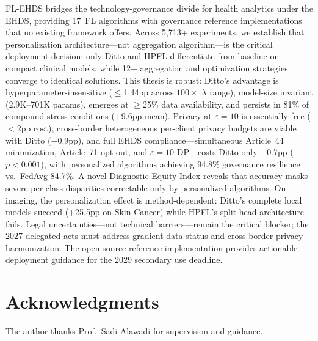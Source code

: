 \documentclass[conference]{IEEEtran}
\begin{document}
FL-EHDS bridges the technology-governance divide for health analytics under the EHDS, providing 17~FL algorithms with governance reference implementations that no existing framework offers. Across 5,713+ experiments, we establish that personalization architecture---not aggregation algorithm---is the critical deployment decision: only Ditto and HPFL differentiate from baseline on compact clinical models, while 12+ aggregation and optimization strategies converge to identical solutions. This thesis is robust: Ditto's advantage is hyperparameter-insensitive ($\leq$1.44pp across $100\times$ $\lambda$ range), model-size invariant (2.9K--701K params), emerges at $\geq$25\% data availability, and persists in 81\% of compound stress conditions ($+$9.6pp mean). Privacy at $\varepsilon{=}10$ is essentially free ($<$2pp cost), cross-border heterogeneous per-client privacy budgets are viable with Ditto ($-$0.9pp), and full EHDS compliance---simultaneous Article~44 minimization, Article~71 opt-out, and $\varepsilon{=}10$ DP---costs Ditto only $-$0.7pp ($p{<}0.001$), with personalized algorithms achieving 94.8\% governance resilience vs.\ FedAvg 84.7\%. A novel Diagnostic Equity Index reveals that accuracy masks severe per-class disparities correctable only by personalized algorithms. On imaging, the personalization effect is method-dependent: Ditto's complete local models succeed ($+$25.5pp on Skin Cancer) while HPFL's split-head architecture fails. Legal uncertainties---not technical barriers---remain the critical blocker; the 2027 delegated acts must address gradient data status and cross-border privacy harmonization. The open-source reference implementation provides actionable deployment guidance for the 2029 secondary use deadline.

\section*{Acknowledgments}
The author thanks Prof.~Sadi Alawadi for supervision and guidance.


\end{document}

